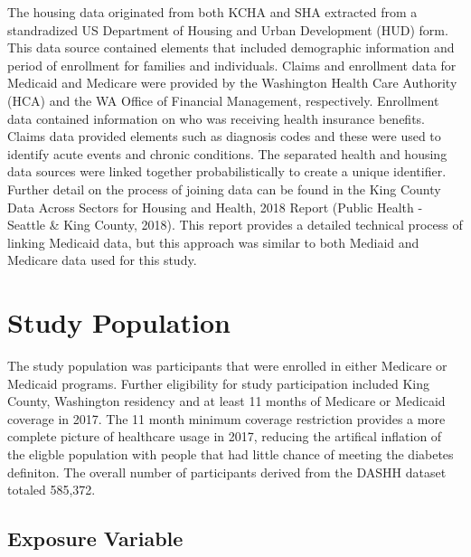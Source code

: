 \documentclass [11pt, proquest] {uwthesis}[2015/03/03]
\begin{document}
The housing data originated from both KCHA and SHA extracted from a
standradized US Department of Housing and Urban Development (HUD) form.
This data source contained elements that included demographic
information and period of enrollment for families and individuals.
Claims and enrollment data for Medicaid and Medicare were provided by
the Washington Health Care Authority (HCA) and the WA Office of
Financial Management, respectively. Enrollment data contained
information on who was receiving health insurance benefits. Claims data
provided elements such as diagnosis codes and these were used to
identify acute events and chronic conditions. The separated health and
housing data sources were linked together probabilistically to create a
unique identifier. Further detail on the process of joining data can be
found in the King County Data Across Sectors for Housing and Health,
2018 Report (Public Health - Seattle \& King County, 2018). This report
provides a detailed technical process of linking Medicaid data, but this
approach was similar to both Mediaid and Medicare data used for this
study.

\section{Study Population}\label{study-population}

The study population was participants that were enrolled in either
Medicare or Medicaid programs. Further eligibility for study
participation included King County, Washington residency and at least 11
months of Medicare or Medicaid coverage in 2017. The 11 month minimum
coverage restriction provides a more complete picture of healthcare
usage in 2017, reducing the artifical inflation of the eligble
population with people that had little chance of meeting the diabetes
definiton. The overall number of participants derived from the DASHH
dataset totaled 585,372.

\subsection{Exposure Variable}\label{exposure-variable}
\end{document}
